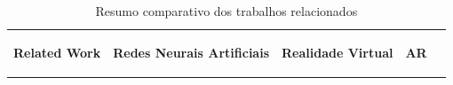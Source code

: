 \begin{table}[!hbt]
\centering
\caption{Resumo comparativo dos trabalhos relacionados}
\begin{tabular}{ >{\centering}m{8cm} | >{\centering}m{1cm} | >{\centering}m{1cm} | >{\centering}m{1.1cm} | >{\centering}m{1cm} }
\hline
\cellcolor[gray]{0.9} \textbf{Related Work} & 
\cellcolor[gray]{0.9} \begin{sideways} \textbf{Redes Neurais Artificiais} { }\end{sideways}&
\cellcolor[gray]{0.9} \begin{sideways} \textbf{Realidade Virtual} \end{sideways}&
\cellcolor[gray]{0.9} \begin{sideways} \textbf{\hspace{-20pt}AR} \end{sideways}


\end{tabular}
\end{table}
